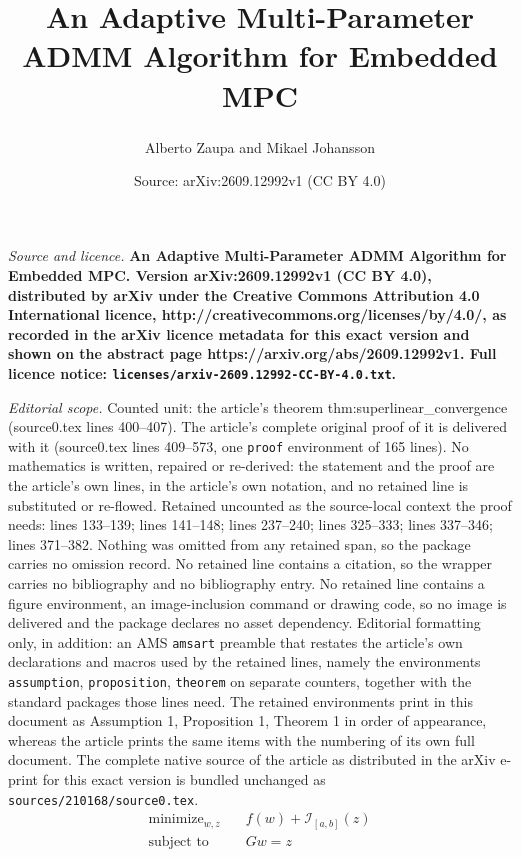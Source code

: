 \documentclass[10pt,a4paper]{amsart}
\title{\LARGE \bf An Adaptive Multi-Parameter ADMM Algorithm for Embedded MPC}
\author{Alberto Zaupa\textsuperscript{\ddag} and Mikael Johansson\textsuperscript{\ddag}}
\date{Source: arXiv:2609.12992v1 (CC BY 4.0)}
\DeclareMathOperator*{\minimize}{minimize}
\begin{document}
\maketitle

\noindent\emph{Source and licence.} \LARGE \bf An Adaptive Multi-Parameter ADMM Algorithm for Embedded MPC. Version arXiv:2609.12992v1 (CC BY 4.0), distributed by arXiv under the Creative Commons Attribution 4.0 International licence, http://creativecommons.org/licenses/by/4.0/, as recorded in the arXiv licence metadata for this exact version and shown on the abstract page https://arxiv.org/abs/2609.12992v1. Full licence notice: \texttt{licenses/arxiv-2609.12992-CC-BY-4.0.txt}.\par\smallskip

\noindent\textit{Editorial scope.} Counted unit: the article's theorem thm:superlinear\_convergence (source0.tex lines 400--407). The article's complete original proof of it is delivered with it (source0.tex lines 409--573, one \texttt{proof} environment of 165 lines). No mathematics is written, repaired or re-derived: the statement and the proof are the article's own lines, in the article's own notation, and no retained line is substituted or re-flowed.  Retained uncounted as the source-local context the proof needs: lines 133--139; lines 141--148; lines 237--240; lines 325--333; lines 337--346; lines 371--382.  Nothing was omitted from any retained span, so the package carries no omission record.  No retained line contains a citation, so the wrapper carries no bibliography and no bibliography entry.  No retained line contains a figure environment, an image-inclusion command or drawing code, so no image is delivered and the package declares no asset dependency.  Editorial formatting only, in addition: an AMS \texttt{amsart} preamble that restates the article's own declarations and macros used by the retained lines, namely the environments \texttt{assumption}, \texttt{proposition}, \texttt{theorem} on separate counters, together with the standard packages those lines need.  The retained environments print in this document as Assumption 1, Proposition 1, Theorem 1 in order of appearance, whereas the article prints the same items with the numbering of its own full document.  The complete native source of the article as distributed in the arXiv e-print for this exact version is bundled unchanged as \texttt{sources/210168/source0.tex}.
\begin{equation}
\label{eq:admm_mpc}
\begin{aligned}
    \minimize_{w,z} &\quad f(w) + \mathcal{I}_{[a,b]}(z) \\
    \text{subject to} &\quad Gw = z
\end{aligned}
\end{equation}
\end{document}
